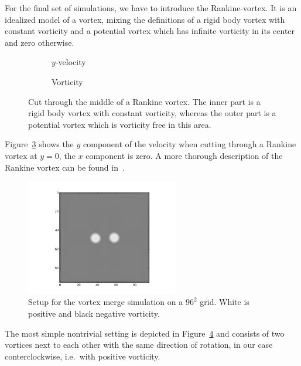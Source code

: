 
For the final set of simulations, we have to introduce the Rankine-vortex.
It is an idealized model of a vortex, mixing the definitions of a rigid body vortex
with constant vorticity and a potential vortex which has infinite vorticity in its center and zero otherwise.

\begin{figure}
\centering
\begin{subfigure}[b]{.5\textwidth}
  \centering
  
  \caption{$y$-velocity}
\label{fig: rankine}
\end{subfigure}%
\begin{subfigure}[b]{.5\textwidth}
  \centering
  
  \caption{Vorticity}
\label{fig: rankine vorticity}
\end{subfigure}
\caption{Cut through the middle of a Rankine vortex.
The inner part is a rigid body vortex with constant vorticity, whereas the outer part is a potential vortex which is vorticity free in this area.}
\label{fig: rankine}
\end{figure}

Figure~\ref{fig: rankine} shows the $y$ component of the velocity when cutting through a Rankine vortex at $y=0$, the $x$ component is zero.
A more thorough description of the Rankine vortex can be found in~\cite{giaiotti2006rankine}.

\begin{figure}
  \centering
  \includegraphics[width=0.6\textwidth]{../figures/rankine_vortex.png}  %
  \caption{Setup for the vortex merge simulation on a $96^2$ grid. White is positive and black negative vorticity.}
\label{fig: vortex merge setup}
\end{figure}

The most simple nontrivial setting is depicted in Figure~\ref{fig: vortex merge setup} and consists of two vortices next to each other with the same direction of rotation, in our case conterclockwise, i.e.\ with positive vorticity.

